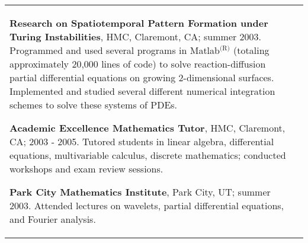 \documentclass{article}
\begin{document}
\begin{center}
\begin{tabular}{@{}p{\CWa\columnwidth}@{}p{\CWb\columnwidth}@{}}
\begin{minipage}[t]{\CWb\columnwidth}
\vspace{\VSEX}
\par \textbf{Research on Spatiotemporal Pattern Formation under Turing Instabilities}, HMC, Claremont, CA; summer 2003. Programmed and used several programs in Matlab$^{\text{(R)}}$ (totaling approximately 20,000 lines of code) to solve reaction-diffusion partial differential equations on growing 2-dimensional surfaces. Implemented and studied several different numerical integration schemes to solve these systems of PDEs.
\vspace{\VSEX}
\par \textbf{Academic Excellence Mathematics Tutor}, HMC, Claremont, CA; 2003 - 2005. Tutored students in linear algebra, differential equations, multivariable calculus, discrete mathematics; conducted workshops and exam review sessions.
\par \textbf{Park City Mathematics Institute}, Park City, UT; summer 2003. Attended lectures on wavelets, partial differential equations, and Fourier analysis.
\end{minipage}
\end{tabular}

\vspace{\VS}


\end{center}
\end{document}
